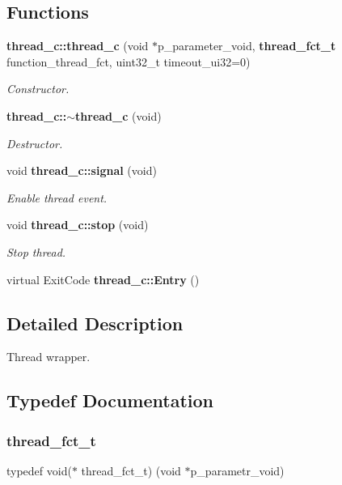 \subsection*{Functions}
\begin{DoxyCompactItemize}
\item 
\textbf{ thread\+\_\+c\+::thread\+\_\+c} (void $\ast$p\+\_\+parameter\+\_\+void, \textbf{ thread\+\_\+fct\+\_\+t} function\+\_\+thread\+\_\+fct, uint32\+\_\+t timeout\+\_\+ui32=0)
\begin{DoxyCompactList}\small\item\em Constructor. \end{DoxyCompactList}\item 
\textbf{ thread\+\_\+c\+::$\sim$thread\+\_\+c} (void)
\begin{DoxyCompactList}\small\item\em Destructor. \end{DoxyCompactList}\item 
void \textbf{ thread\+\_\+c\+::signal} (void)
\begin{DoxyCompactList}\small\item\em Enable thread event. \end{DoxyCompactList}\item 
void \textbf{ thread\+\_\+c\+::stop} (void)
\begin{DoxyCompactList}\small\item\em Stop thread. \end{DoxyCompactList}\item 
virtual Exit\+Code \textbf{ thread\+\_\+c\+::\+Entry} ()
\end{DoxyCompactItemize}


\subsection{Detailed Description}
Thread wrapper. 



\subsection{Typedef Documentation}
\mbox{\label{group___thread_ga7cb6c85fe4a6993e52fcbc5cb79dca16}} 
\subsubsection{thread\_fct\_t}
{\footnotesize\ttfamily typedef void($\ast$ thread\+\_\+fct\+\_\+t) (void $\ast$p\+\_\+parametr\+\_\+void)}

